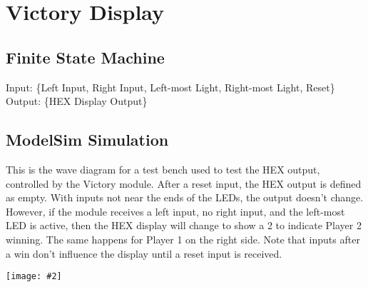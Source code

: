 \documentclass{article}
\newenvironment{solution}{\begin{mdframed}[style=SolutionFrame]}{\end{mdframed}}
\newcommand{\img}[2][0.9]{
    \begin{minipage}[t]{0.9\linewidth}
        \begin{center}
            \texttt{[image: \#2]}
        \end{center}
    \end{minipage}
}
\begin{document}
\newpage
\section{Victory Display}
    \subsection{Finite State Machine}
    \begin{solution}
        Input: \{Left Input, Right Input, Left-most Light, Right-most Light, Reset\} \\
        Output: \{HEX Display Output\}
        \begin{center}
        \end{center}
    \end{solution}

    \subsection{ModelSim Simulation}
        \begin{solution}
            This is the wave diagram for a test bench used to test the HEX output, controlled by the Victory module. After a reset input, the HEX output is defined as empty. With inputs not near the ends of the LEDs, the output doesn't change. However, if the module receives a left input, no right input, and the left-most LED is active, then the HEX display will change to show a 2 to indicate Player 2 winning. The same happens for Player 1 on the right side. Note that inputs after a win don't influence the display until a reset input is received. \\
            \img{victory_waves.png}
        \end{solution}

\newpage
\end{document}
